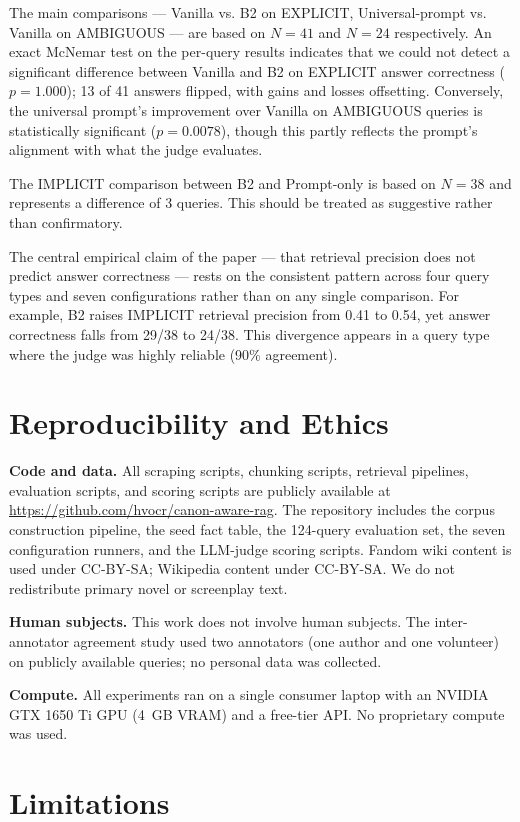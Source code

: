 \documentclass[conference]{IEEEtran}
\begin{document}
The main comparisons --- Vanilla vs. B2 on EXPLICIT, Universal-prompt vs. Vanilla on AMBIGUOUS --- are based on $N = 41$ and $N = 24$ respectively. An exact McNemar test on the per-query results indicates that we could not detect a significant difference between Vanilla and B2 on EXPLICIT answer correctness ($p = 1.000$); 13 of 41 answers flipped, with gains and losses offsetting. Conversely, the universal prompt's improvement over Vanilla on AMBIGUOUS queries is statistically significant ($p = 0.0078$), though this partly reflects the prompt's alignment with what the judge evaluates.

The IMPLICIT comparison between B2 and Prompt-only is based on $N = 38$ and represents a difference of 3 queries. This should be treated as suggestive rather than confirmatory.

The central empirical claim of the paper --- that retrieval precision does not predict answer correctness --- rests on the consistent pattern across four query types and seven configurations rather than on any single comparison. For example, B2 raises IMPLICIT retrieval precision from 0.41 to 0.54, yet answer correctness falls from 29/38 to 24/38. This divergence appears in a query type where the judge was highly reliable (90\% agreement).

\section{Reproducibility and Ethics}

\textbf{Code and data.} All scraping scripts, chunking scripts, retrieval pipelines, evaluation scripts, and scoring scripts are publicly available at \url{https://github.com/hvocr/canon-aware-rag}. The repository includes the corpus construction pipeline, the seed fact table, the 124-query evaluation set, the seven configuration runners, and the LLM-judge scoring scripts. Fandom wiki content is used under CC-BY-SA; Wikipedia content under CC-BY-SA. We do not redistribute primary novel or screenplay text.

\textbf{Human subjects.} This work does not involve human subjects. The inter-annotator agreement study used two annotators (one author and one volunteer) on publicly available queries; no personal data was collected.

\textbf{Compute.} All experiments ran on a single consumer laptop with an NVIDIA GTX 1650 Ti GPU (4~GB VRAM) and a free-tier API. No proprietary compute was used.

\section{Limitations}
\end{document}
